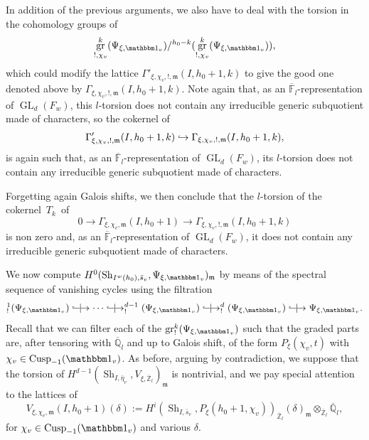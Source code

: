 \documentclass[JEP,XML,SOM,Unicode,published]{cedram}
\let\mathds\mathbbm
\newcommand{\NoChangel}[1]{%
\expandafter\let\csname old\string#1\endcsname=#1
\let#1=\relax
\newcommand{#1}{\mathcode`l="716C\csname old\string#1\endcsname\mathcode`l="7160 }%
}
\def\hto{\mathrel{\lhook\joinrel\to}}
\DeclareMathOperator{\GL}{GL}
\newcommand*{\harrow}{\lhook\joinrel\relbar\joinrel\mid\joinrel\rightarrow}
\theoremstyle{plain}
\theoremstyle{definition}
\numberwithin{equation}{subsection}
\newcommand\Fm{{\mathbb F}}
\newcommand\Qm{{\mathbb Q}}
\newcommand\Zm{{\mathbb Z}}
\DeclareMathOperator{\sh}{Sh}
\DeclareMathOperator{\cusp}{Cusp}
\DeclareMathOperator{\gr}{gr}
\DeclareMathOperator{\Fil}{Fil}\NoChangel{\Fil}
\begin{document}
In addition of the previous arguments, we also have to deal with the
torsion in the cohomology groups of
\[
\gr^{k}_{!,\chi_v}(\Psi_{\xi,\mathds 1_v}) /\Fil^{h_0-k}(\gr^{k}_{!,\chi_v}
(\Psi_{\xi,\mathds 1_v})),
\]
which could modify the lattice $\Gamma'_{\xi,\chi_v,!,\mathfrak m}
(I,h_0+1,k)$ to give the good one denoted above by
$\Gamma_{\xi,\chi_v,!,\mathfrak m}(I,h_0+1,k)$. Note
again that,
as an $\overline \Fm_l$-representation of $\GL_d(F_w)$, this $l$-torsion
does not contain any
irreducible generic subquotient made of characters, so the cokernel of
\[
\Gamma'_{\xi,\chi_v,!,\mathfrak m} (I,h_0+1,k)
\hto \Gamma_{\xi,\chi_v,!,\mathfrak m}(I,h_0+1,k),
\]
is again such that, as an $\overline \Fm_l$-representation of
$\GL_d(F_w)$, its $l$-torsion does not contain any irreducible generic
subquotient made of characters.

Forgetting again Galois shifts, we then conclude that the $l$-torsion of
the cokernel~$T_k$~of
\begin{equation} \label{eq-absurd}
0 \to \Gamma_{\xi,\chi_v,\mathfrak m}(I,h_0+1)
\to \Gamma_{\xi,\chi_v,!,\mathfrak m}
(I,h_0+1,k)
\end{equation}
is non zero and,
as an $\overline \Fm_l$-representation of $\GL_d(F_w)$, it
does not contain any
irreducible generic subquotient made of characters.

\medskip

We now compute $H^{0}(\sh_{I^w(h_0),\bar s_v},\Psi_{\xi,\mathds 1_v}
)_{\mathfrak m}$ by means of the spectral
sequence of vanishing cycles using the filtration
\[
\Fil^{1}_!(\Psi_{\xi,\mathds 1_v}) \harrow \cdots \harrow \Fil^{d-1}_!
(\Psi_{\xi,\mathds 1_v}) \harrow
\Fil^{d}_!(\Psi_{\xi,\mathds 1_v}) \harrow \Psi_{\xi,\mathds 1_v}.
\]
Recall that we can filter each of the
$\gr^k_!(\Psi_{\xi,\mathds 1_v})$
such that the graded parts are, after tensoring with $\overline \Qm_l$ and up to
Galois shift, of the form $P_\xi(\chi_v,t)$ with $\chi_v \in \cusp_{-1}(\mathds 1_v)$.
As before, arguing by contradiction,
we suppose that the torsion of
$H^{d-1}(\sh_{I,\bar \eta_v},V_{\xi,\overline \Zm_l})_{\mathfrak m}$
is nontrivial, and we pay special attention to the lattices of
\begin{equation} \label{eq-def-Vrho}
V_{\xi,\chi_v,\mathfrak m}(I,h_0+1)(\delta):=
H^i(\sh_{I,\bar s_v},P_\xi(h_0+1,\chi_v))_{\overline \Zm_l}(\delta)_{\mathfrak m}
\otimes_{\overline \Zm_l} \overline \Qm_l,
\end{equation}
for $\chi_v \in \cusp_{-1}(\mathds 1_v)$ and various $\delta$.
\end{document}
